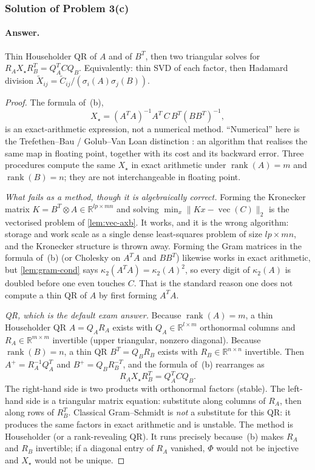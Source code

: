 \documentclass[11pt,a4paper]{article}
\DeclareMathOperator{\rank}{rank}
\begin{document}
\subsubsection{Solution of Problem 3(c)}

\paragraph{Answer.}
Thin Householder QR of \(A\) and of \(B^{T}\), then two triangular solves for \(R_{A}X_{\star}R_{B}^{T}=Q_{A}^{T}CQ_{B}\). Equivalently: thin SVD of each factor, then Hadamard division \(\tilde{X}_{ij}=\tilde{C}_{ij}/(\sigma_{i}(A)\sigma_{j}(B))\).

\begin{proof}
The formula of~(b),
\[
X_{\star}
=
(A^{T}A)^{-1}A^{T}\,C\,B^{T}(BB^{T})^{-1},
\]
is an exact-arithmetic expression, not a numerical method. ``Numerical'' here is the Trefethen--Bau / Golub--Van Loan distinction \cite{trefethen97,golub96}: an algorithm that realises the same map in floating point, together with its cost and its backward error. Three procedures compute the same \(X_{\star}\) in exact arithmetic under \(\rank(A)=m\) and \(\rank(B)=n\); they are not interchangeable in floating point.

\emph{What fails as a method, though it is algebraically correct.}
Forming the Kronecker matrix \(K=B^{T}\otimes A\in\mathbb{R}^{lp\times mn}\) and solving \(\min_{x}\|Kx-\operatorname{vec}(C)\|_{2}\) is the vectorised problem of \cref{lem:vec-axb}. It works, and it is the wrong algorithm: storage and work scale as a single dense least-squares problem of size \(lp\times mn\), and the Kronecker structure is thrown away. Forming the Gram matrices in the formula of~(b) (or Cholesky on \(A^{T}A\) and \(BB^{T}\)) likewise works in exact arithmetic, but \cref{lem:gram-cond} says \(\kappa_{2}(A^{T}A)=\kappa_{2}(A)^{2}\), so every digit of \(\kappa_{2}(A)\) is doubled before one even touches \(C\). That is the standard reason one does not compute a thin QR of \(A\) by first forming \(A^{T}A\).

\emph{QR, which is the default exam answer.}
Because \(\rank(A)=m\), a thin Householder QR \(A=Q_{A}R_{A}\) exists with \(Q_{A}\in\mathbb{R}^{l\times m}\) orthonormal columns and \(R_{A}\in\mathbb{R}^{m\times m}\) invertible (upper triangular, nonzero diagonal). Because \(\rank(B)=n\), a thin QR \(B^{T}=Q_{B}R_{B}\) exists with \(R_{B}\in\mathbb{R}^{n\times n}\) invertible. Then \(A^{+}=R_{A}^{-1}Q_{A}^{T}\) and \(B^{+}=Q_{B}R_{B}^{-T}\), and the formula of~(b) rearranges as
\[
R_{A}X_{\star}R_{B}^{T}
=
Q_{A}^{T}CQ_{B}.
\]
The right-hand side is two products with orthonormal factors (stable). The left-hand side is a triangular matrix equation: substitute along columns of \(R_{A}\), then along rows of \(R_{B}^{T}\). Classical Gram--Schmidt is \emph{not} a substitute for this QR: it produces the same factors in exact arithmetic and is unstable. The method is Householder (or a rank-revealing QR). It runs precisely because~(b) makes \(R_{A}\) and \(R_{B}\) invertible; if a diagonal entry of \(R_{A}\) vanished, \(\Phi\) would not be injective and \(X_{\star}\) would not be unique.


\end{proof}
\end{document}
